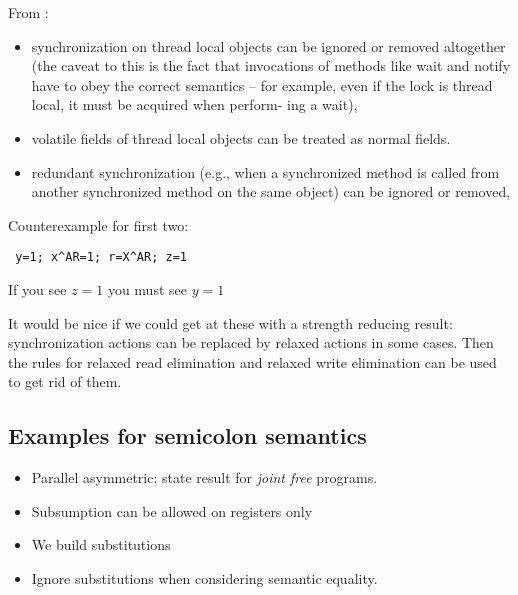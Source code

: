 From \cite{Manson:2005:JMM:1047659.1040336}:
\begin{itemize}
\item synchronization on thread local objects can be ignored or removed
  altogether (the caveat to this is the fact that invocations of methods like
  wait and notify have to obey the correct semantics – for example, even if
  the lock is thread local, it must be acquired when perform- ing a wait),
   
\item volatile fields of thread local objects can be treated as normal
  fields.

\item redundant synchronization (e.g., when a synchronized method is called
  from another synchronized method on the same object) can be ignored or
  removed,
  
\end{itemize}

Counterexample for first two:
\begin{verbatim}
 y=1; x^AR=1; r=X^AR; z=1
\end{verbatim}
If you see $z=1$ you must see $y=1$

It would be nice if we could get at these with a strength reducing result:
synchronization actions can be replaced by relaxed actions in some cases.
Then the rules for relaxed read elimination and relaxed write elimination can
be used to get rid of them.

\subsection{Examples for semicolon semantics}

\begin{itemize}
\item Parallel asymmetric: state result for \emph{joint free} programs. 
\item Subsumption can be allowed on registers only
\item We build substitutions
\item Ignore substitutions when considering semantic equality.
\end{itemize}


